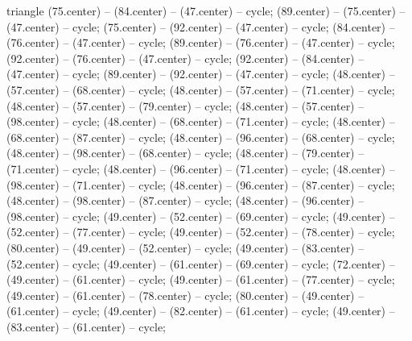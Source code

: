 \begin{pgfonlayer}{triangle}
 (75.center) -- (84.center) -- (47.center) -- cycle; 
 (89.center) -- (75.center) -- (47.center) -- cycle; 
 (75.center) -- (92.center) -- (47.center) -- cycle; 
 (84.center) -- (76.center) -- (47.center) -- cycle; 
 (89.center) -- (76.center) -- (47.center) -- cycle; 
 (92.center) -- (76.center) -- (47.center) -- cycle; 
 (92.center) -- (84.center) -- (47.center) -- cycle; 
 (89.center) -- (92.center) -- (47.center) -- cycle; 
 (48.center) -- (57.center) -- (68.center) -- cycle; 
 (48.center) -- (57.center) -- (71.center) -- cycle; 
 (48.center) -- (57.center) -- (79.center) -- cycle; 
 (48.center) -- (57.center) -- (98.center) -- cycle; 
 (48.center) -- (68.center) -- (71.center) -- cycle; 
 (48.center) -- (68.center) -- (87.center) -- cycle; 
 (48.center) -- (96.center) -- (68.center) -- cycle; 
 (48.center) -- (98.center) -- (68.center) -- cycle; 
 (48.center) -- (79.center) -- (71.center) -- cycle; 
 (48.center) -- (96.center) -- (71.center) -- cycle; 
 (48.center) -- (98.center) -- (71.center) -- cycle; 
 (48.center) -- (96.center) -- (87.center) -- cycle; 
 (48.center) -- (98.center) -- (87.center) -- cycle; 
 (48.center) -- (96.center) -- (98.center) -- cycle; 
 (49.center) -- (52.center) -- (69.center) -- cycle; 
 (49.center) -- (52.center) -- (77.center) -- cycle; 
 (49.center) -- (52.center) -- (78.center) -- cycle; 
 (80.center) -- (49.center) -- (52.center) -- cycle; 
 (49.center) -- (83.center) -- (52.center) -- cycle; 
 (49.center) -- (61.center) -- (69.center) -- cycle; 
 (72.center) -- (49.center) -- (61.center) -- cycle; 
 (49.center) -- (61.center) -- (77.center) -- cycle; 
 (49.center) -- (61.center) -- (78.center) -- cycle; 
 (80.center) -- (49.center) -- (61.center) -- cycle; 
 (49.center) -- (82.center) -- (61.center) -- cycle; 
 (49.center) -- (83.center) -- (61.center) -- cycle; 

\end{pgfonlayer}
